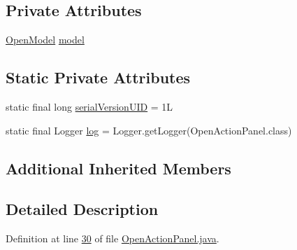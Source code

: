 \subsection*{Private Attributes}
\begin{DoxyCompactItemize}
\item 
\hyperlink{classcom_1_1poly_1_1nlp_1_1filekommander_1_1views_1_1models_1_1_open_model}{Open\-Model} \hyperlink{classcom_1_1poly_1_1nlp_1_1filekommander_1_1views_1_1panels_1_1_open_action_panel_aba846378e4e1fd54f49642dcf88cb3d6}{model}
\end{DoxyCompactItemize}
\subsection*{Static Private Attributes}
\begin{DoxyCompactItemize}
\item 
static final long \hyperlink{classcom_1_1poly_1_1nlp_1_1filekommander_1_1views_1_1panels_1_1_open_action_panel_a2f0300dacedd726f9822a744a90284cd}{serial\-Version\-U\-I\-D} = 1\-L
\item 
static final Logger \hyperlink{classcom_1_1poly_1_1nlp_1_1filekommander_1_1views_1_1panels_1_1_open_action_panel_ae294b0a7ffcc9883269b1392750065b5}{log} = Logger.\-get\-Logger(Open\-Action\-Panel.\-class)
\end{DoxyCompactItemize}
\subsection*{Additional Inherited Members}


\subsection{Detailed Description}


Definition at line \hyperlink{L30}{30} of file \hyperlink{}{Open\-Action\-Panel.\-java}.




